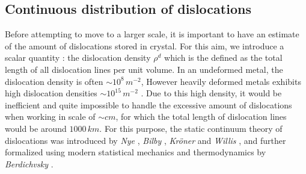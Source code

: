 \documentclass{article}
\begin{document}
\subsection{Continuous distribution of dislocations}
Before attempting to move to a larger scale, it is important to have an estimate of the amount of dislocations stored in crystal. For this aim, we introduce a scalar quantity : the dislocation density $\rho^d$ which is the defined as the total length of all dislocation lines per unit volume. In an undeformed metal, the dislocation density is often $\sim 10^8\, m^{-2}$, However heavily deformed metals exhibits high dislocation densities  $\sim 10^{15}\, m^{-2}$ \parencite{kochmannMechanicalmodeling2009}. Due to this high density, it would be inefficient and quite impossible to handle the excessive amount of dislocations when working in scale of $\sim cm$, for which the total length of dislocation lines would be around $1000\,km$. For this purpose, the static continuum theory of dislocations was introduced by \emph{Nye} \parencite{nyeGeometricalRelations1953}, \emph{Bilby} \parencite{bilbly1955}, \emph{Kröner}\parencite{kroenerAllgemeineKontinuumstheorie1959} and \emph{Willis} \parencite{willisSecondordereffects1967a}, and further formalized using modern statistical mechanics and thermodynamics by \emph{Berdichvsky} \parencite{berdichevskyContinuumtheory2006}.\\
\end{document}
